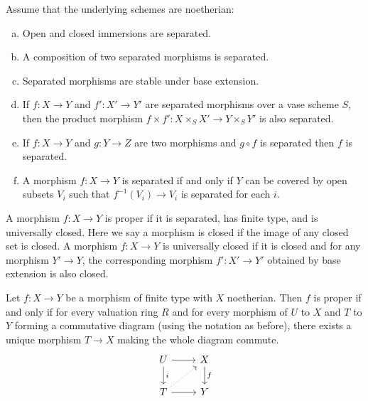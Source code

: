 \begin{prop}
Assume that the underlying schemes are noetherian:
\begin{enumerate}[(a)]
\item Open and closed immersions are separated.
\item A composition of two separated morphisms is separated.
\item Separated morphisms are stable under base extension.
\item If $f: X \to Y$ and $f': X' \to Y'$ are separated morphisms over a vase scheme $S$, then the product morphism $f \times f': X \times_S X' \to Y \times_S Y'$ is also separated.
\item If $f: X \to Y$ and $g: Y \to Z$ are two morphisms and $g \circ f$ is separated then $f$ is separated.
\item A morphism $f: X \to Y$ is separated if and only if $Y$ can be covered by open subsets $V_i$ such that $f^{-1}(V_i) \to V_i$ is separated for each $i$. 
\end{enumerate}
\end{prop}


\begin{dfn}
A morphism $f: X \to Y$ is proper if it is separated, has finite type, and is universally closed. Here we say a morphism is closed if the image of any closed set is closed. A morphism $f: X \to Y$ is universally closed if it is closed and for any morphism $Y' \to Y$, the corresponding morphism $f': X' \to Y'$ obtained by base extension is also closed.
\end{dfn}


\begin{thmm}
Let $f: X \to Y$ be a morphism of finite type with $X$ noetherian. Then $f$ is proper if and only if for every valuation ring $R$ and for every morphism of $U$ to $X$ and $T$ to $Y$ forming a commutative diagram (using the notation as before), there exists a unique morphism $T \to X$ making the whole diagram commute. 
	\[
	\begin{tikzcd}
	U \arrow{d}{i} \arrow{r} & X \arrow{d}{f} \\
	T \arrow[dotted]{ur} \arrow{r} & Y 
	\end{tikzcd}
	\] 
\end{thmm}


